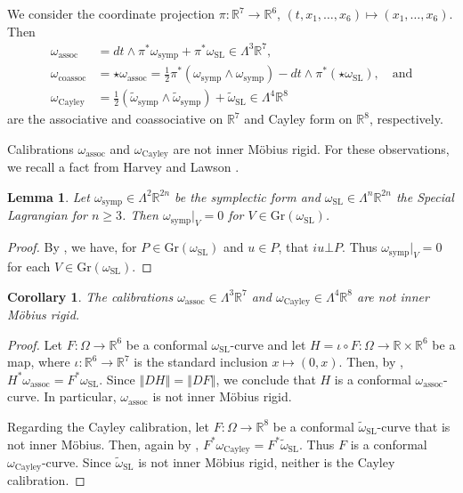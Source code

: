 \documentclass[a4paper,leqno,11pt]{amsart}
\numberwithin{equation}{section}
\newtheorem{corollary}[theorem]{Corollary}
\newtheorem{lemma}[theorem]{Lemma}
\theoremstyle{remark}
\theoremstyle{remark}
\newcommand{\R}{\mathbb{R}}
\newcommand{\norm}[1]{ \left\Vert #1 \right\Vert }	%
\newcommand{\symp}{\mathrm{symp}}
\newcommand{\Gr}{\mathrm{Gr}}
\newcommand{\SL}{\mathrm{SL}}
\newcommand{\assoc}{\mathrm{assoc}}
\newcommand{\coassoc}{\mathrm{coassoc}}
\newcommand{\Cayley}{\mathrm{Cayley}}
\begin{document}
We consider the coordinate projection $\pi \colon \R^7 \to \R^6$, $( t, x_1, \dots, x_6 ) \mapsto ( x_1, \dots, x_6 )$. Then
\begin{align*}
    \omega_\assoc &=  dt \wedge \pi^*\omega_{\symp} + \pi^*\omega_{\SL} 
    \in \Lambda^3 \R^7, 
    \\
    \omega_{\coassoc} 
    &= \star \omega_\assoc 
    = 
    \frac{1}{2} \pi^* \left(  \omega_\symp \wedge \omega_\symp \right) - dt \wedge \pi^*( \star \omega_\SL ),
\quad \text{and} \\
\omega_\Cayley 
&= \frac{1}{2}\left( \widetilde{\omega}_{\symp} \wedge \widetilde{\omega}_{\symp}\right) + \widetilde{\omega}_{\SL} 
\in \Lambda^4 \R^8
\end{align*}
are the associative and coassociative on $\R^7$ and Cayley form on $\R^8$, respectively.






Calibrations $\omega_\assoc$ and $\omega_\Cayley$ are not inner Möbius rigid. For these observations, we recall a fact from Harvey and Lawson \cite{Har:Law:82}.
\begin{lemma}
\label{lemma:HL-eq}
Let $\omega_\symp \in \Lambda^2 \R^{2n}$ be the symplectic form and $\omega_\SL \in \Lambda^n \R^{2n}$ the Special Lagrangian for $n \geq 3$. Then $\omega_\symp|_V = 0$ for $V\in \Gr(\omega_\SL)$.
\end{lemma}
\begin{proof}
By \cite[Equation (1.2), p. 87]{Har:Law:82}, we have, for $P\in \Gr(\omega_\SL)$ and $u\in P$, that $i u \bot P$. Thus $\omega_\symp|_V = 0$ for each $V\in \Gr(\omega_\SL)$.
\end{proof}
%
\begin{corollary}\label{cor:assoc:cayley:notrigid}
The calibrations $\omega_\assoc\in \Lambda^3 \R^7$ and $\omega_\Cayley \in \Lambda^4 \R^8$ are not inner Möbius rigid.
\end{corollary}
\begin{proof}
Let $F\colon \Omega \to \R^6$ be a conformal $\omega_\SL$-curve and let $H = \iota \circ F \colon \Omega \to \R \times \R^6$ be a map, where $\iota \colon \R^6 \to \R^7$ is the standard inclusion $x \mapsto (0,x)$. Then, by , $H^*\omega_\assoc = F^*\omega_\SL$. Since $\norm{DH} = \norm{DF}$, we conclude that $H$ is a conformal $\omega_\assoc$-curve. In particular, $\omega_\assoc$ is not inner M\"obius rigid.

Regarding the Cayley calibration, let $F\colon \Omega \to \R^8$ be a conformal $\widetilde{\omega}_\SL$-curve that is not inner Möbius. Then, again by , $F^*\omega_\Cayley = F^*\widetilde{\omega}_\SL$. Thus $F$ is a conformal $\omega_\Cayley$-curve. Since $\widetilde{\omega}_{\SL}$ is not inner Möbius rigid, neither is the Cayley calibration.
\end{proof}
\end{document}

